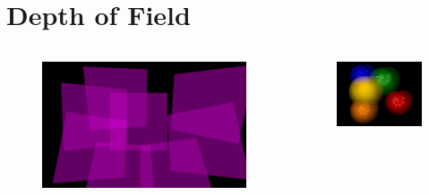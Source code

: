 \documentclass{beamer}
\begin{document}
\section{Depth of Field}
\begin{frame}
	\begin{columns}[T]
		\begin{column}{.5\textwidth}
			\begin{figure}
				\includegraphics[width=\textwidth]{blurryCubes.png}
			\end{figure}
		\end{column}
		\begin{column}{.5\textwidth}
			\begin{figure}
				\includegraphics[width=\textwidth]{blurryBalls.png}
			\end{figure}
		\end{column}
	\end{columns}
\end{frame}
\end{document}
